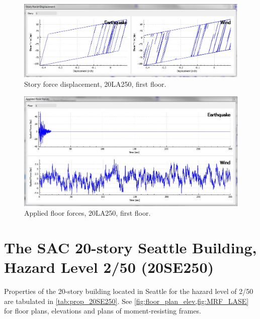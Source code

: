 \documentclass[onecolumn, fleqn]{article}
\begin{document}
\begin{figure}[H]
	\centering \includegraphics[scale=0.35]{20LA250_sfd.JPG}
	\caption{Story force displacement, 20LA250, first floor.}
\end{figure}
\begin{figure}[H]
	\centering \includegraphics[scale=0.35]{20LA250_aff.JPG}
	\caption{Applied floor forces, 20LA250, first floor.}
\end{figure}





\section{The SAC 20-story Seattle Building, Hazard Level 2/50 (20SE250)}
Properties of the 20-story building located in Seattle for the hazard level of 2/50 are tabulated in \cref{tab:prop_20SE250}. See \cref{fig:floor_plan_elev,fig:MRF_LASE} for floor plans, elevations and plans of moment-resisting frames.
\end{document}

